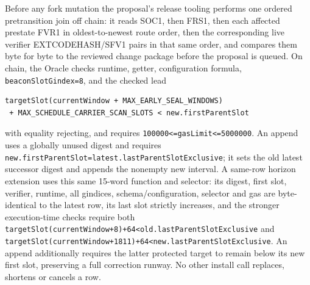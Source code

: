 \documentclass[a4paper,11pt]{article}
\newcommand{\code}[1]{\nolinkurl{#1}}
\begin{document}
Before any fork mutation the proposal's release tooling performs one ordered
pretransition join off chain: it reads SOC1, then FRS1, then each affected
prestate FVR1 in oldest-to-newest route order, then the corresponding live
verifier EXTCODEHASH/SFV1 pairs in that same order, and compares them byte for
byte to the reviewed change package before the proposal is queued.  On chain,
the Oracle checks runtime, getter, configuration formula,
\code{beaconSlotGindex=8}, and the checked lead
\begin{verbatim}
targetSlot(currentWindow + MAX_EARLY_SEAL_WINDOWS)
 + MAX_SCHEDULE_CARRIER_SCAN_SLOTS < new.firstParentSlot
\end{verbatim}
with equality rejecting, and requires \code{100000<=gasLimit<=5000000}.
An append uses a globally unused digest and requires
\code{new.firstParentSlot=latest.lastParentSlotExclusive}; it sets the old
latest successor digest and appends the nonempty new interval.  A same-row
horizon extension uses this same 15-word function and selector: its digest,
first slot, verifier, runtime, all gindices, schema/configuration, selector and
gas are byte-identical to the latest row, its last slot strictly increases,
and the stronger execution-time checks require both
\code{targetSlot(currentWindow+8)+64<old.lastParentSlotExclusive} and
\code{targetSlot(currentWindow+1811)+64<new.lastParentSlotExclusive}.  An
append additionally requires the latter protected target to remain below its
new first slot, preserving a full correction runway.  No other
install call replaces, shortens or cancels a row.
\end{document}
